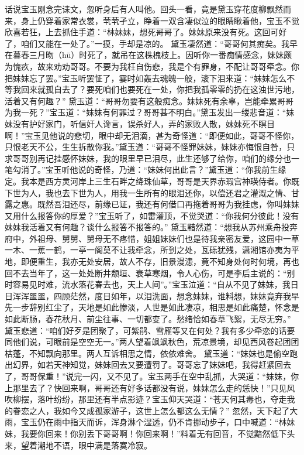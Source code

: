 \documentclass[12pt,oneside]{book}
\begin{document}
话说宝玉刚念完诔文，忽听身后有人叫他。回头一看，竟是黛玉穿花度柳飘然而来，身上仍穿着家常衣裳，茕茕孑立，睁着一双含凄似泣的眼睛瞅着他，宝玉不觉欣喜若狂，上去抓住手道：“林妹妹，想死哥哥了。妹妹原来没有死。这回可好了，咱们又能在一处了。”一摸，手却是凉的。
黛玉凄然道：“哥哥何其痴矣。我早在暮春三月昒（hū）时死了，就吊在这株槐枝上。因听你一番痴情感念，妹妹颇为愧疚，故来劝劝哥哥。不要为我枉自伤悲，我是个有罪身，不配让哥哥牵念。你把妹妹忘了罢。”宝玉听罢怔了，霎时如轰去魂魄一般，滚下泪来道：“妹妹怎么不等我回来就孤自去了？要死咱们也要死在一处，你把我孤零零的扔在这浊世污地，活着又有何趣？”
黛玉道：“哥哥勿要有这般痴念。妹妹死有余辜，岂能牵累哥哥为我一死？”宝玉道：“妹妹有何罪过？哥哥甚不明白。”黛玉发出一缕悲音道：“妹妹没有护好家门，听信奸人谗言，误杀好人，弄的家败人散，妹妹死不瞑目啊！”宝玉见他说的悲切，眼中却无泪滴，甚为奇怪道：“即便如此，哥哥不怪你，只恨老天不公，生生拆散你我。”黛玉道：“哥哥不怪罪妹妹，妹妹亦悔恨自咎，只求哥哥别再记挂感怀妹妹，我的眼里早已泪尽，此生还够了给你，咱们的缘分也一笔勾消了。”宝玉听他说的奇怪，乃道：“妹妹何出此言？”黛玉道：“你我前生缘定。我本是西方灵河岸上三生石畔之绛珠仙草，哥哥是天界赤瑕宫神瑛侍者。你既下世为人，我也去下世为人，用我一生所有的眼泪还你，以偿还君之灌溉之情、甘露之惠。既然吾泪还尽，前缘已证，我还有何借口再拖着哥哥为我挂虑，你叫妹妹又用什么报答你的厚爱？”宝玉听了，如雷灌顶，不觉哭道：“你我何分彼此！没有妹妹我活着又有何趣？谈什么报答不报答的。”
黛玉黯然道：“想我从苏州乘舟投奔府中，外祖母、舅舅、舅母无不疼惜，姐姐妹妹们也是待我亲密友爱，这园中一草一木、一蕉一鹤，一亭一阁莫不让我牵念，所到之处，瓦砾犹残，潇湘馆亦夷为平地，即便重生，我亦无处安居，故人不存，旧景漫漶，竟不知身处何时何境，再也回不去当年了，这一处处断井颓垣、衰草寒烟，令人心伤，可是李后主说的：“别时容易见时难，流水落花春去也，天上人间”。”宝玉泣道：“自从不见了妹妹，我日日浑浑噩噩，四顾茫然，度日如年，以泪洗面，想念妹妹，谁料想，妹妹竟弃我早先一步辞别红尘了，天地是如此惨淡，人世是如此凄凉，相思是如此痛楚，怀念是如此断肠，春花秋月、前尘往事、一切都变了。愁绪恰如春草飞絮，无尽无穷。”
黛玉悲道：“咱们好歹是团聚了，可紫鹃、雪雁等又在何处？我有多少牵恋的话要同他们说，可眼前是空空无一。”两人望着飒飒秋色，荒凉景境，却见西风卷起团团枯蓬，不知飘向那里。两人互诉相思之情，依依难舍。
黛玉道：“妹妹也是偷空跑出幻界，如若天神知觉，妹妹回去又要遭罚了。哥哥忘了妹妹吧，我得赶紧回去了，哥哥保重！”说完一闪，又不见了。宝玉两手在空中乱抓，大哭道：“妹妹，你上那里去了？快回来啊，哥哥还有好多话都没有说，妹妹怎么走的恁快！”只见风吹柳摆，落叶纷纷，那里还有半点影迹？宝玉仰天哭道：“苍天何其毒也，夺走我的眷恋之人，我如今又成孤家游子，这世上怎么都这么无情？”
忽然，天下起了大雨，宝玉仍在雨中指天而诉，浑身淋个湿透，仍不肯挪动步子，口中喊道：“林妹妹，我要你回来！你别丢下哥哥啊！你回来啊！”料着无有回音，不觉黯然低下头来，望着潮地不语，眼中满是落寞冷寂。
\end{document}
